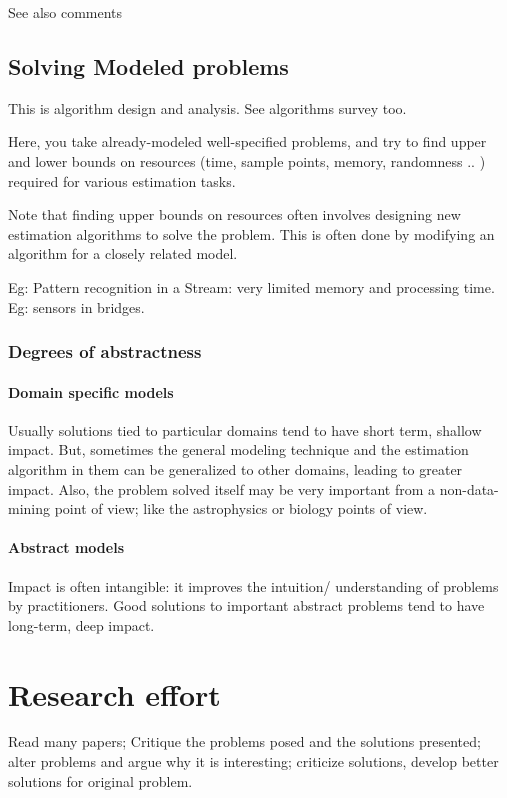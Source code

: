 \documentclass[oneside, article]{memoir}
\begin{document}
See also comments

\subsection{Solving Modeled problems}
This is algorithm design and analysis. See algorithms survey too.

Here, you take already-modeled well-specified problems, and try to find upper and lower bounds on resources (time, sample points, memory, randomness .. ) required for various estimation tasks.

Note that finding upper bounds on resources often involves designing new estimation algorithms to solve the problem. This is often done by modifying an algorithm for a closely related model.

Eg: Pattern recognition in a Stream: very limited memory and processing time. Eg: sensors in bridges.

\subsubsection{Degrees of abstractness}
\paragraph*{Domain specific models}
Usually solutions tied to particular domains tend to have short term, shallow impact. But, sometimes the general modeling technique and the estimation algorithm in them can be generalized to other domains, leading to greater impact. Also, the problem solved itself may be very important from a non-data-mining point of view; like the astrophysics or biology points of view.

\paragraph*{Abstract models}
Impact is often intangible: it improves the intuition/ understanding of problems by practitioners. Good solutions to important abstract problems tend to have long-term, deep impact.

\section{Research effort}
Read many papers; Critique the problems posed and the solutions presented; alter problems and argue why it is interesting; criticize solutions, develop better solutions for original problem.
\end{document}
